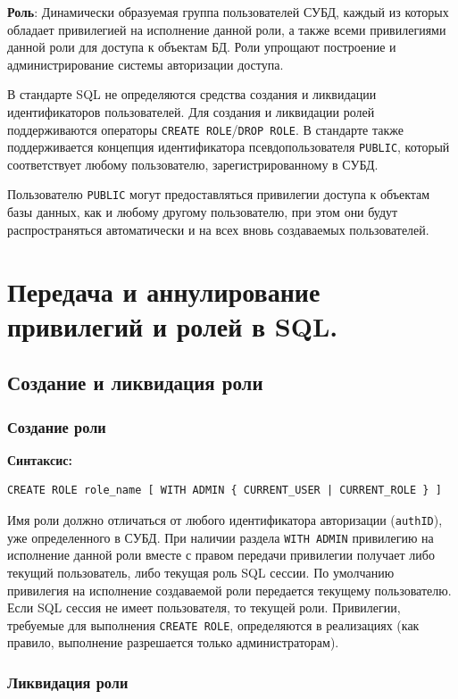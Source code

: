 \documentclass[a4paper,12pt]{article}
\begin{document}
\textbf{Роль}: Динамически образуемая группа пользователей СУБД, каждый из которых обладает привилегией на исполнение данной роли, а также всеми привилегиями данной роли для доступа к объектам БД. Роли упрощают построение и администрирование системы авторизации доступа.

В стандарте SQL не определяются средства создания и ликвидации идентификаторов пользователей. Для создания и ликвидации ролей поддерживаются операторы \texttt{CREATE ROLE}/\texttt{DROP ROLE}. В стандарте также поддерживается концепция идентификатора псевдопользователя \texttt{PUBLIC}, который соответствует любому пользователю, зарегистрированному в СУБД.

Пользователю \texttt{PUBLIC} могут предоставляться привилегии доступа к объектам базы данных, как и любому другому пользователю, при этом они будут распространяться автоматически и на всех вновь создаваемых пользователей.


\section{Передача и аннулирование привилегий и ролей в SQL.}
\subsection{Создание и ликвидация роли}

\subsubsection{Создание роли}

\textbf{Синтаксис:}
\begin{verbatim}
CREATE ROLE role_name [ WITH ADMIN { CURRENT_USER | CURRENT_ROLE } ]
\end{verbatim}

Имя роли должно отличаться от любого идентификатора авторизации (\texttt{authID}), уже определенного в СУБД. При наличии раздела \texttt{WITH ADMIN} привилегию на исполнение данной роли вместе с правом передачи привилегии получает либо текущий пользователь, либо текущая роль SQL сессии. По умолчанию привилегия на исполнение создаваемой роли передается текущему пользователю. Если SQL сессия не имеет пользователя, то текущей роли. Привилегии, требуемые для выполнения \texttt{CREATE ROLE}, определяются в реализациях (как правило, выполнение разрешается только администраторам).

\subsubsection{Ликвидация роли}
\end{document}
